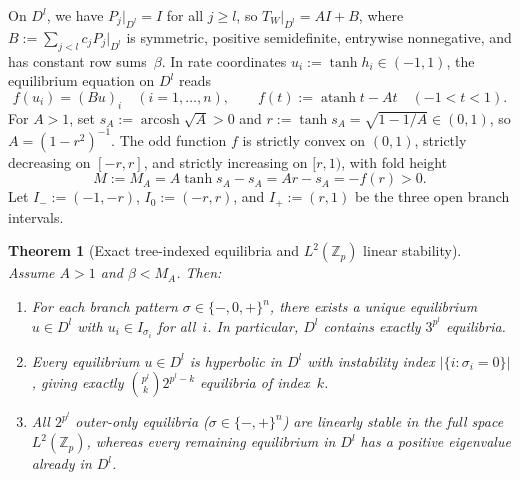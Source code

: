 \documentclass[11pt]{article}
\theoremstyle{plain}
\newtheorem{theorem}{Theorem}
\theoremstyle{definition}
\theoremstyle{remark}
\DeclareMathOperator{\atanh}{atanh}
\DeclareMathOperator{\arcosh}{arcosh}
\begin{document}
On $D^l$, we have $P_j|_{D^l} = I$ for all $j \ge l$, so $T_W|_{D^l} = AI + B$, where $B := \sum_{j < l} c_j P_j|_{D^l}$ is symmetric, positive semidefinite, entrywise nonnegative, and has constant row sums~$\beta$.
In rate coordinates $u_i := \tanh h_i \in (-1, 1)$, the equilibrium equation on $D^l$ reads
\[
f(u_i) = (Bu)_i \quad (i = 1, \dots, n), \qquad f(t) := \atanh t - At \quad (-1 < t < 1).
\]
For $A > 1$, set $s_A := \arcosh\sqrt{A} > 0$ and $r := \tanh s_A = \sqrt{1 - 1/A} \in (0, 1)$, so $A = (1 - r^2)^{-1}$.
The odd function $f$ is strictly convex on $(0, 1)$, strictly decreasing on $[-r, r]$, and strictly increasing on $[r, 1)$, with fold height
\[
M := M_A = A\tanh s_A - s_A = Ar - s_A = -f(r) > 0.
\]
Let $I_- := (-1, -r)$, $I_0 := (-r, r)$, and $I_+ := (r, 1)$ be the three open branch intervals.

\begin{theorem}[Exact tree-indexed equilibria and $L^2(\mathbb{Z}_p)$ linear stability]\label{thm:tree}
Assume $A > 1$ and $\beta < M_A$. Then:
\begin{enumerate}[label=\textup{(\arabic*)},nosep]
\item For each branch pattern $\sigma \in \{-, 0, +\}^n$, there exists a unique equilibrium $u \in D^l$ with $u_i \in I_{\sigma_i}$ for all~$i$. In particular, $D^l$ contains \emph{exactly} $3^{p^l}$ equilibria.
\item Every equilibrium $u \in D^l$ is hyperbolic in $D^l$ with instability index $|\{i : \sigma_i = 0\}|$, giving exactly $\binom{p^l}{k} 2^{p^l - k}$ equilibria of index~$k$.
\item All $2^{p^l}$ outer-only equilibria ($\sigma \in \{-, +\}^n$) are linearly stable in the full space $L^2(\mathbb{Z}_p)$, whereas every remaining equilibrium in $D^l$ has a positive eigenvalue already in $D^l$.
\end{enumerate}
\end{theorem}
\end{document}
